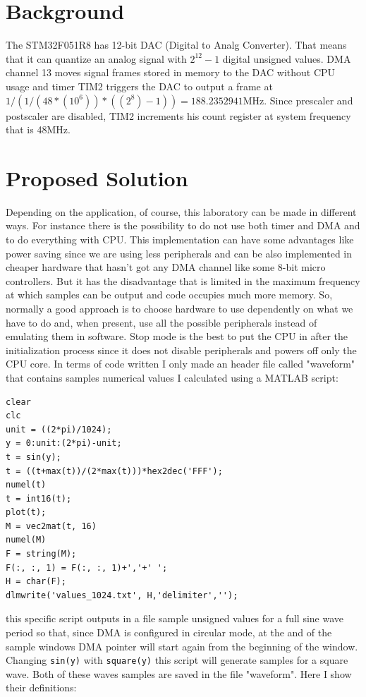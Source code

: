 \documentclass[peerreview]{IEEEtran}
\begin{document}
\section{Background}
The STM32F051R8 has 12-bit DAC (Digital to Analg Converter). That means that it can quantize an analog signal with $2^{12}-1$ digital unsigned values. DMA channel 13 moves signal frames stored in memory to the DAC without CPU usage and timer TIM2 triggers the DAC to output a frame at $1/(1/(48*(10^{6}))*((2^{8})-1)) = 188.2352941$MHz. Since prescaler and postscaler are disabled, TIM2 increments his count register at system frequency that is 48MHz.
\section{Proposed Solution}
Depending on the application, of course, this laboratory can be made in different ways. For instance there is the possibility to do not use both timer and DMA and to do everything with CPU. This implementation can have some advantages like power saving since we are using less peripherals and can be also implemented in cheaper hardware that hasn't got any DMA channel like some 8-bit micro controllers. But it has the disadvantage that is limited in the maximum frequency at which samples can be output and code occupies much more memory. So, normally a good approach is to choose hardware to use dependently on what we have to do and, when present, use all the possible peripherals instead of emulating them in software.
Stop mode is the best to put the CPU in after the initialization process since it does not disable peripherals and powers off only the CPU core.
In terms of code written I only made an header file called "waveform" that contains samples numerical values I calculated  using a MATLAB script:
\begin{lstlisting}[style=Matlab]
clear
clc
unit = ((2*pi)/1024);
y = 0:unit:(2*pi)-unit;
t = sin(y);
t = ((t+max(t))/(2*max(t)))*hex2dec('FFF');
numel(t)
t = int16(t);
plot(t);
M = vec2mat(t, 16)
numel(M)
F = string(M);
F(:, :, 1) = F(:, :, 1)+','+' ';
H = char(F);
dlmwrite('values_1024.txt', H,'delimiter','');
\end{lstlisting}
this specific script outputs in a file sample unsigned values for a full sine wave period so that, since DMA is configured in circular mode, at the and of the sample windows DMA pointer will start again from the beginning of the window. Changing \lstinline[style=Matlab]{sin(y)} with \lstinline[style=Matlab]{square(y)} this script will generate samples for a square wave. Both of these waves samples are saved in the file  "waveform". Here I show their definitions:
\end{document}
